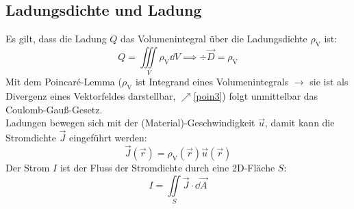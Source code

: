  \subsection{Ladungsdichte und Ladung}
Es gilt, dass die Ladung $Q$ das Volumenintegral über die Ladungsdichte $\rho_{\text{V}}$ ist:
	        \begin{equation}
		        Q = \iiint\limits_{V} \rho_{\text{V}}\dd V \implies \boxed
		        {\div\vec{D} = \rho_\text{V} }
	        \end{equation}
	   Mit dem Poincaré-Lemma ($\rho_{\text{V}}$ ist Integrand eines Volumenintegrals $\to$ sie ist als Divergenz eines Vektorfeldes darstellbar, $\nearrow$\ref{poin3}) folgt unmittelbar das Coulomb-Gauß-Gesetz.\\
	   Ladungen bewegen sich mit der (Material)-Geschwindigkeit $\vec{u}$, damit kann die Stromdichte $\vec{J}$ eingeführt werden:
	        \begin{equation}
		        \vec{J}(\vec{r}) = \rho_{\text{V}}(\vec{r})\vec{u}(\vec{r})
	        \end{equation}
	   Der Strom $I$ ist der Fluss der Stromdichte durch eine 2D-Fläche $S$:
	        \begin{equation}
		        I = \iint\limits_{S} \vec{J}\cdot \dd\vec{A}
	        \end{equation}
